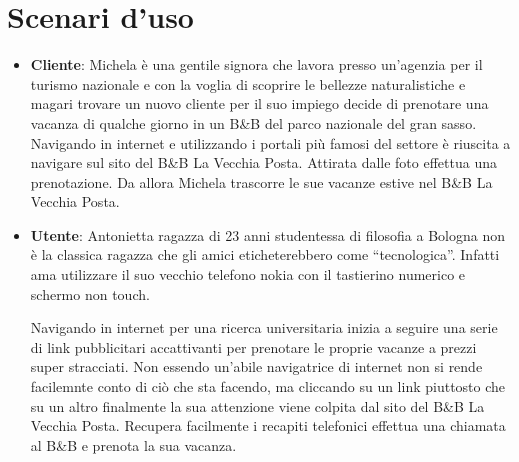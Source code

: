 \documentclass[a4paper,12pt,hidelinks]{report}
\begin{document}
\section{Scenari d'uso}
\par
\begin{itemize}
 \item \textbf{Cliente}: Michela è una gentile signora che lavora presso un'agenzia per il turismo nazionale e con la voglia di scoprire le bellezze naturalistiche e magari trovare
 un nuovo cliente per il suo impiego decide di prenotare una vacanza di qualche giorno in un B\&B del parco nazionale del gran sasso. Navigando in internet e utilizzando i portali 
 più famosi del settore è riuscita a navigare sul sito del B\&B La Vecchia Posta. Attirata dalle foto effettua una prenotazione. Da allora Michela trascorre le sue vacanze estive nel 
 B\&B La Vecchia Posta.
 
 \item \textbf{Utente}: Antonietta ragazza di 23 anni studentessa di filosofia a Bologna non è la classica ragazza che gli amici eticheterebbero come ``tecnologica''. Infatti ama utilizzare
 il suo vecchio telefono nokia con il tastierino numerico e schermo non touch. 
 \par Navigando in internet per una ricerca universitaria inizia a seguire una serie di link pubblicitari accattivanti
 per prenotare le proprie vacanze a prezzi super stracciati. Non essendo un'abile navigatrice di internet non si rende facilemnte conto di ciò che sta facendo, ma cliccando su un link piuttosto che su un altro
 finalmente la sua attenzione viene colpita dal sito del B\&B La Vecchia Posta. Recupera facilmente i recapiti telefonici effettua una chiamata al B\&B e prenota la sua vacanza.
\end{itemize}
\end{document}
